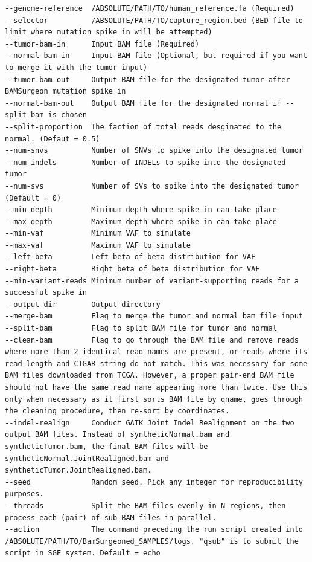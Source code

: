 \documentclass[10pt,letterpaper]{article}
\begin{document}
\begin{sloppypar}
\begin{lstlisting}
--genome-reference  /ABSOLUTE/PATH/TO/human_reference.fa (Required)
--selector          /ABSOLUTE/PATH/TO/capture_region.bed (BED file to limit where mutation spike in will be attempted)
--tumor-bam-in      Input BAM file (Required)
--normal-bam-in     Input BAM file (Optional, but required if you want to merge it with the tumor input)
--tumor-bam-out     Output BAM file for the designated tumor after BAMSurgeon mutation spike in
--normal-bam-out    Output BAM file for the designated normal if --split-bam is chosen
--split-proportion  The faction of total reads desginated to the normal. (Defaut = 0.5)
--num-snvs          Number of SNVs to spike into the designated tumor
--num-indels        Number of INDELs to spike into the designated tumor
--num-svs           Number of SVs to spike into the designated tumor (Default = 0)
--min-depth         Minimum depth where spike in can take place
--max-depth         Maximum depth where spike in can take place
--min-vaf           Minimum VAF to simulate
--max-vaf           Maximum VAF to simulate
--left-beta         Left beta of beta distribution for VAF
--right-beta        Right beta of beta distribution for VAF
--min-variant-reads Minimum number of variant-supporting reads for a successful spike in
--output-dir        Output directory
--merge-bam         Flag to merge the tumor and normal bam file input
--split-bam         Flag to split BAM file for tumor and normal
--clean-bam         Flag to go through the BAM file and remove reads where more than 2 identical read names are present, or reads where its read length and CIGAR string do not match. This was necessary for some BAM files downloaded from TCGA. However, a proper pair-end BAM file should not have the same read name appearing more than twice. Use this only when necessary as it first sorts BAM file by qname, goes through the cleaning procedure, then re-sort by coordinates.
--indel-realign     Conduct GATK Joint Indel Realignment on the two output BAM files. Instead of syntheticNormal.bam and syntheticTumor.bam, the final BAM files will be syntheticNormal.JointRealigned.bam and syntheticTumor.JointRealigned.bam.
--seed              Random seed. Pick any integer for reproducibility purposes.
--threads           Split the BAM files evenly in N regions, then process each (pair) of sub-BAM files in parallel. 
--action            The command preceding the run script created into /ABSOLUTE/PATH/TO/BamSurgeoned_SAMPLES/logs. "qsub" is to submit the script in SGE system. Default = echo
\end{lstlisting}



\end{sloppypar}
\end{document}
